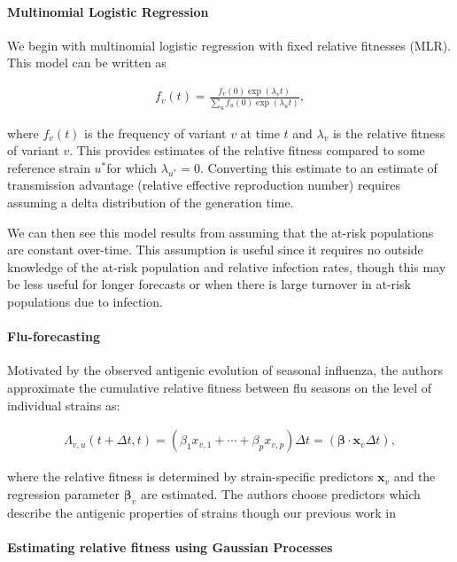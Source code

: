 \documentclass[12pt,oneside,letterpaper]{article}
\renewcommand{\vec}[1]{\boldsymbol{#1}}
\begin{document}
\paragraph{Multinomial Logistic Regression}%

We begin with multinomial logistic regression with fixed relative fitnesses (MLR).
This model can be written as

\begin{align*}
    f_{v}(t) = \frac{f_{v}(0) \exp(\lambda_{v} t)}{\sum_{u} f_{u}(0) \exp(\lambda_{u} t)},
\end{align*}

where $f_{v}(t)$ is the frequency of variant $v$ at time $t$ and $\lambda_{v}$ is the relative fitness of variant $v$.
This provides estimates of the relative fitness compared to some reference strain $u^{*}$for which $\lambda_{u^*} = 0$.
Converting this estimate to an estimate of transmission advantage (relative effective reproduction number) requires assuming a delta distribution of the generation time. \cite{Wallinga2006}

We can then see this model results from assuming that the at-risk populations are constant over-time.
This assumption is useful since it requires no outside knowledge of the at-risk population and relative infection rates, though this may be less useful for longer forecasts or when there is large turnover in at-risk populations due to infection.

\paragraph{Flu-forecasting}%

Motivated by the observed antigenic evolution of seasonal influenza, the authors approximate the cumulative relative fitness between flu seasons on the level of individual strains as:

\begin{align*}
    \Lambda_{v,u}(t + \Delta t,t) = (\beta_{1} x_{v,1} + \cdots + \beta_{p} x_{v, p})\Delta t = (\vec{\beta} \cdot \vec{x}_{v} \Delta t),
\end{align*}

where the relative fitness is determined by strain-specific predictors $\vec{x}_{v}$ and the regression parameter $\vec{\beta}_{v}$ are estimated.
The authors choose predictors which describe the antigenic properties of strains though our previous work in 

\paragraph{Estimating relative fitness using Gaussian Processes}%
\end{document}
